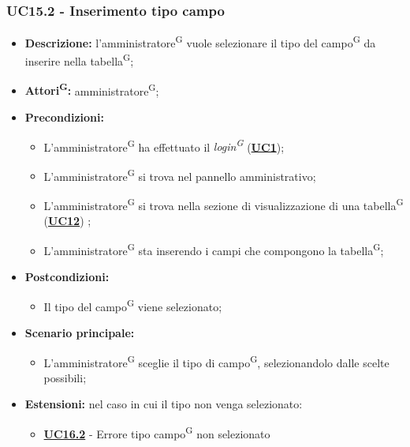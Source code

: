\subsubsection{UC15.2 - Inserimento tipo campo}
\label{sec:UC15.2}
\begin{itemize}
	\item \textbf{Descrizione:} l’amministratore\textsuperscript{G} vuole selezionare il tipo del campo\textsuperscript{G} da inserire nella tabella\textsuperscript{G};
	\item \textbf{Attori\textsuperscript{G}:} amministratore\textsuperscript{G};
	\item \textbf{Precondizioni:} 
	\begin{itemize}
		\item L’amministratore\textsuperscript{G} ha effettuato il \textit{login\textsuperscript{G}} (\hyperref[sec:UC1]{\textbf{UC1}});
		\item L’amministratore\textsuperscript{G} si trova nel pannello amministrativo;
		\item L’amministratore\textsuperscript{G} si trova nella sezione di visualizzazione di una tabella\textsuperscript{G} (\hyperref[sec:UC12]{\textbf{UC12}}) ;
		\item L’amministratore\textsuperscript{G} sta inserendo i campi che compongono la tabella\textsuperscript{G};
	\end{itemize}
	\item \textbf{Postcondizioni:} 
	\begin{itemize}
		\item Il tipo del campo\textsuperscript{G} viene selezionato;
	\end{itemize}
	\item \textbf{Scenario principale:} 
	\begin{itemize}
		\item L’amministratore\textsuperscript{G} sceglie il tipo di campo\textsuperscript{G}, selezionandolo dalle scelte possibili;
	\end{itemize}
	\item \textbf{Estensioni:} nel caso in cui il tipo non venga selezionato:
	\begin{itemize}
		\item \hyperref[sec:UC16.2]{\textbf{UC16.2}} - Errore tipo campo\textsuperscript{G} non selezionato
	\end{itemize}
\end{itemize}

